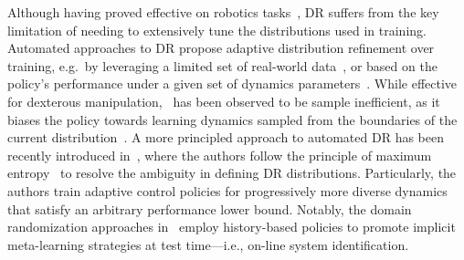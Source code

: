Although having proved effective on robotics tasks~\citep{antonova2017reinforcement}, DR suffers from the key limitation of needing to extensively tune the distributions used in training. Automated approaches to DR propose adaptive distribution refinement over training, e.g.~by leveraging a limited set of real-world data~\cite{tiboniadrbenchmark,tiboni2023dropo}, or based on the policy's performance under a given set of dynamics parameters~\citep{akkaya2019solving}. While effective for dexterous manipulation,~\cite{akkaya2019solving} has been observed to be sample inefficient, as it biases the policy towards learning dynamics sampled from the boundaries of the current distribution~\citep{tiboni2023domain}. A more principled approach to automated DR has been recently introduced in~\cite{tiboni2023domain}, where the authors follow the principle of maximum entropy~\citep{jaynes1957information} to resolve the ambiguity in defining DR distributions. Particularly, the authors train adaptive control policies for progressively more diverse dynamics that satisfy an arbitrary performance lower bound.
Notably, the domain randomization approaches in~\cite{akkaya2019solving,tiboni2023domain} employ history-based policies to promote implicit meta-learning strategies at test time---i.e., on-line system identification.
